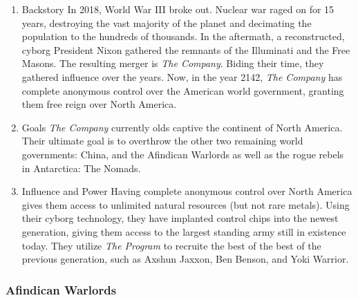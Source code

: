 \documentclass[11pt]{article}
\begin{document}
\begin{enumerate}
\item Backstory
\label{sec:org5ddad1d}
In 2018, World War III broke out. Nuclear war raged on for 15 years, destroying the vast majority of the planet and decimating the population to the hundreds of thousands. In the aftermath, a reconstructed, cyborg President Nixon gathered the remnants of the Illuminati and the Free Masons. The resulting merger is \emph{The Company}. Biding their time, they gathered influence over the years. Now, in the year 2142, \emph{The Company} has complete anonymous control over the American world government, granting them free reign over North America.

\item Goals
\label{sec:org5d1ed84}
\emph{The Company} currently olds captive the continent of North America. Their ultimate goal is to overthrow the other two remaining world governments: China, and the Afindican Warlords as well as the rogue rebels in Antarctica: The Nomads.

\item Influence and Power
\label{sec:org6dfc4d7}
Having complete anonymous control over North America gives them access to unlimited natural resources (but not rare metals). Using their cyborg technology, they have implanted control chips into the newest generation, giving them access to the largest standing army still in existence today. They utilize \emph{The Program} to recruite the best of the best of the previous generation, such as Axshun Jaxxon, Ben Benson, and Yoki Warrior.
\end{enumerate}

\subsubsection{Afindican Warlords}
\label{sec:orgd79be71}
\end{document}
